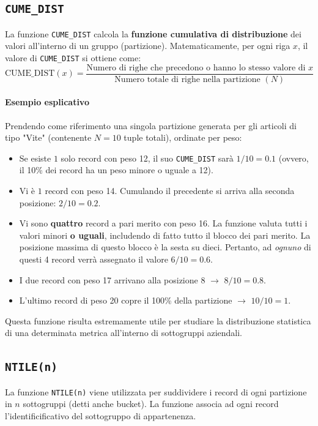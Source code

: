 \subsection{\texttt{CUME\_DIST}}

La funzione \texttt{CUME\_DIST} calcola la \textbf{funzione cumulativa di distribuzione} dei valori all'interno di un gruppo (partizione).
Matematicamente, per ogni riga $x$, il valore di \texttt{CUME\_DIST} si ottiene come:
\[
\text{CUME\_DIST}(x) = \frac{\text{Numero di righe che precedono o hanno lo stesso valore di } x}{\text{Numero totale di righe nella partizione } (N)}
\]

\paragraph{Esempio esplicativo}
Prendendo come riferimento una singola partizione generata per gli articoli di tipo "Vite" (contenente $N=10$ tuple totali), ordinate per peso:
\begin{itemize}
    \item Se esiste $1$ solo record con peso 12, il suo \texttt{CUME\_DIST} sarà $1/10 = 0.1$ (ovvero, il 10\% dei record ha un peso minore o uguale a 12).
    \item Vi è $1$ record con peso 14. Cumulando il precedente si arriva alla seconda posizione: $2/10 = 0.2$.
    \item Vi sono \textbf{quattro} record a pari merito con peso 16. La funzione valuta tutti i valori minori \textbf{o uguali}, includendo di fatto tutto il blocco dei pari merito. La posizione massima di questo blocco è la sesta su dieci. Pertanto, ad \textit{ognuno} di questi 4 record verrà assegnato il valore $6/10 = 0.6$.
    \item I due record con peso 17 arrivano alla posizione 8 $\rightarrow$ $8/10 = 0.8$.
    \item L'ultimo record di peso 20 copre il 100\% della partizione $\rightarrow$ $10/10 = 1$.
\end{itemize}

Questa funzione risulta estremamente utile per studiare la distribuzione statistica di una determinata metrica all'interno di sottogruppi aziendali.

\subsection{\texttt{NTILE(n)}}

La funzione \texttt{NTILE(n)} viene utilizzata per suddividere i record di ogni partizione in $n$ sottogruppi (detti anche bucket). La funzione associa ad ogni record l'identificificativo del sottogruppo di appartenenza.

